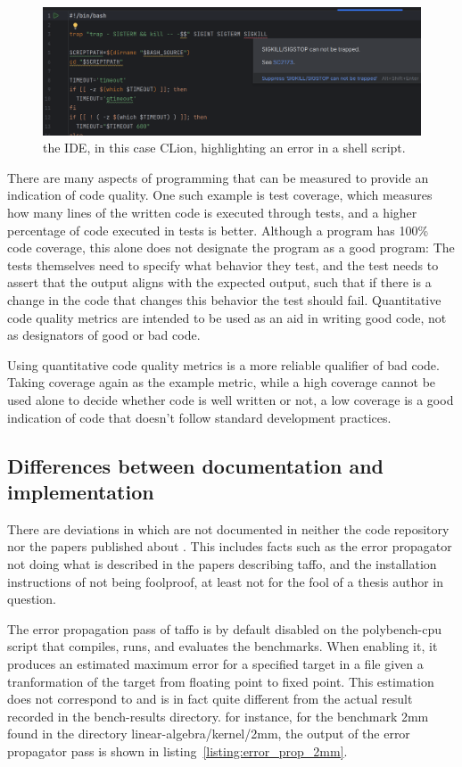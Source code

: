 \begin{figure}[h]
    \centering
    \includegraphics[width=0.5\linewidth]{Images/IDE_highlighting.png}
    \caption{the IDE, in this case CLion, highlighting an error in a shell script.}
    \label{fig:IDE_highlighting}
\end{figure}

There are many aspects of programming that can be measured to provide an indication of code quality. One such example is test coverage, which measures how many lines of the written code is executed through tests, and a higher percentage of code executed in tests is better. Although a program has 100\% code coverage, this alone does not designate the program as a good program: The tests themselves need to specify what behavior they test, and the test needs to assert that the output aligns with the expected output, such that if there is a change in the code that changes this behavior the test should fail. Quantitative code quality metrics are intended to be used as an aid in writing good code, not as designators of good or bad code. 

Using quantitative code quality metrics is a more reliable qualifier of bad code. Taking coverage again as the example metric, while a high coverage cannot be used alone to decide whether code is well written or not, a low coverage is a good indication of code that doesn't follow standard development practices.  


\subsection{Differences between documentation and implementation}

There are deviations in \taffo{} which are not documented in neither the code repository nor the papers published about \taffo{}. 
This includes facts such as the error propagator not doing what is described in the papers describing taffo, and the installation instructions of \taffo{} not being foolproof, at least not for the fool of a thesis author in question.

The error propagation pass of taffo is by default disabled on the polybench-cpu script that compiles, runs, and evaluates the benchmarks. When enabling it, it produces an estimated maximum error for a specified target in a file given a tranformation of the target from floating point to fixed point. This estimation does not correspond to and is in fact quite different from the actual result recorded in the bench-results directory. for instance, for the benchmark 2mm found in the directory linear-algebra/kernel/2mm, the output of the error propagator pass is shown in listing~\ref{listing:error_prop_2mm}.

